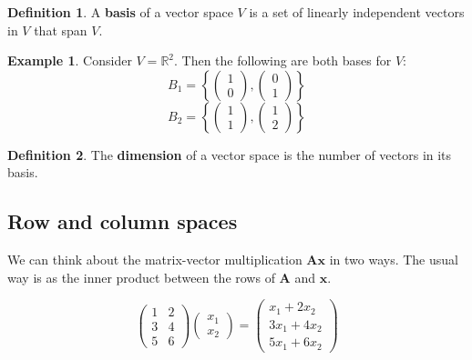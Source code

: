 \documentclass[
]{book}
\theoremstyle{definition}
\newtheorem{definition}{Definition}[chapter]
\theoremstyle{definition}
\newtheorem{example}{Example}[chapter]
\theoremstyle{definition}
\theoremstyle{definition}
\theoremstyle{remark}
\begin{document}
\begin{definition}
\protect\hypertarget{def:basis}{}\label{def:basis}A \textbf{basis} of a vector space \(V\) is a set of linearly independent vectors in \(V\) that span \(V\).
\end{definition}

\begin{example}
\protect\hypertarget{exm:basisRp}{}\label{exm:basisRp}Consider \(V=\mathbb{R}^2\). Then the following are both bases for \(V\):
\[B_1=\left\{\left(\begin{array}{c}1\\0\end{array}\right), \left(\begin{array}{c}0\\1\end{array}\right)\right\}
\]
\[B_2=\left\{\left(\begin{array}{c}1\\1\end{array}\right), \left(\begin{array}{c}1\\2\end{array}\right)\right\}
\]
\end{example}

\begin{definition}
\protect\hypertarget{def:dimension}{}\label{def:dimension}The \textbf{dimension} of a vector space is the number of vectors in its basis.
\end{definition}

\subsection{Row and column spaces}\label{colsspace}

We can think about the matrix-vector multiplication \(\mathbf A\mathbf x\) in two ways. The usual way is as the inner product between the rows of \(\mathbf A\) and \(\mathbf x\).

\[ \left( \begin{array}{cc} 1 & 2\\ 3&4\\5&6\end{array}\right) \left(\begin{array}{c}x_1\\ x_2\end{array}\right) = \left(\begin{array}{c} x_1+2x_2\\3x_1+4x_2\\5x_1+6x_2\end{array}\right)\]
\end{document}
